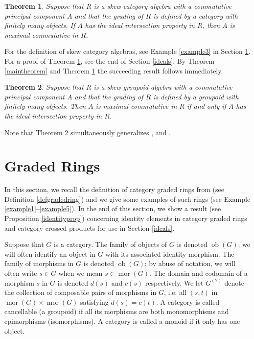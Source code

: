 \documentclass[11pt,leqno]{amsart}
\theoremstyle{plain}
\newtheorem{thm}{Theorem}
\theoremstyle{definition}
\DeclareMathOperator{\ob}{ob}
\DeclareMathOperator{\mor}{mor}
\begin{document}
\begin{thm}\label{skewcatalg}
Suppose that $R$ is a skew category
algebra with a commutative principal
component $A$ and that the grading of $R$ is defined by a
category with finitely many objects.
If $A$ has the ideal intersection property in $R$,
then $A$ is maximal commutative in $R$.
\end{thm}

For the definition of skew category algebras,
see Example \ref{example3} in Section \ref{gradedrings}.
For a proof of Theorem \ref{skewcatalg},
see the end of Section \ref{ideals}.
By Theorem \ref{maintheorem} and Theorem \ref{skewcatalg}
the succeeding result follows immediately.

\begin{thm}\label{skewgroupoidtheorem}
Suppose that $R$ is a skew groupoid
algebra with a commutative principal
component $A$ and that the grading of $R$ is defined by a
groupoid with finitely many objects.
Then $A$ is maximal commutative in $R$
if and only if $A$ has the ideal intersection
property in $R$.
\end{thm}

Note that Theorem \ref{skewgroupoidtheorem} simultaneously generalizes
\cite[Theorem 3.4]{oinert09}, \cite[Corollary 6]{oinlun08}
and \cite[Proposition 10]{oinlun08}.



\section{Graded Rings}\label{gradedrings}



In this section, we recall the definition of
category graded rings from \cite{lu06}
(see Definition \ref{defgradedring}) and we give some examples
of such rings (see Example \ref{example1}--\ref{example5}).
In the end of this section, we show a result
(see Proposition \ref{identityprop}) concerning
identity elements in category graded rings
and category crossed products
for use in Section \ref{ideals}.

Suppose that $G$ is a category.
The family of objects of $G$ is denoted $\ob(G)$;
we will often identify an object in $G$ with
its associated identity morphism.
The family of morphisms in $G$ is denoted $\ob(G)$;
by abuse of notation, we will often write $s \in G$
when we mean $s \in \mor(G)$.
The domain and codomain of a morphism $s$ in $G$ is denoted
$d(s)$ and $c(s)$ respectively.
We let $G^{(2)}$ denote the collection of composable
pairs of morphisms in $G$, i.e. all $(s,t)$ in
$\mor(G) \times \mor(G)$ satisfying $d(s)=c(t)$.
A category is called cancellable (a groupoid)
if all its morphisms are both monomorphisms
and epimorphisms (isomorphisms).
A category is called a monoid if
it only has one object.
\end{document}
